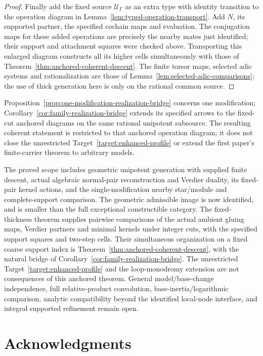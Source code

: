 \documentclass[11pt]{article}
\theoremstyle{definition}
\theoremstyle{remark}
\begin{document}
\begin{proof}
Finally add the fixed source $\mathcal U_\Gamma$ as an extra type
with identity transition to the operation diagram in
Lemma~\ref{lem:typed-operation-transport}.  Add $N$, its supported
partner, the specified cochain maps and evaluation.  The conjugation
maps for these added operations are precisely the nearby mates just
identified; their support and attachment squares were checked above.
Transporting this enlarged diagram constructs all its higher cells
simultaneously with those of Theorem~\ref{thm:anchored-coherent-descent}.
The finite torsor maps, selected adic systems and rationalization are
those of Lemma~\ref{lem:selected-adic-comparisons}; the use of thick
generation here is only on the rational common source.
\end{proof}

Proposition~\ref{prop:one-modification-realization-bridge} concerns one
modification; Corollary~\ref{cor:family-realization-bridge} extends its
specified arrows to the fixed-cut anchored diagrams on the same
rational unipotent subsource.  The resulting coherent statement is restricted to that anchored
operation diagram; it does not close the unrestricted
Target~\ref{target:enhanced-profile} or extend the first paper's
finite-carrier theorem to arbitrary models.

The proved scope includes geometric unipotent generation with supplied
finite descent, actual algebraic normal-pair reconstruction and
Verdier duality, its fixed-pair kernel actions, and the single-modification
nearby star/module and complete-support comparison.  The geometric
admissible image is now identified, and is smaller than the full
exceptional constructible category.  The fixed-thickness theorem supplies pairwise comparisons of the
actual ambient gluing maps, Verdier partners and minimal kernels under
integer cuts, with the specified support squares and two-step cells.
Their simultaneous organization on a fixed coarse support index is
Theorem~\ref{thm:anchored-coherent-descent}, with the natural bridge of
Corollary~\ref{cor:family-realization-bridge}.  The unrestricted
Target~\ref{target:enhanced-profile} and the loop-monodromy extension
are not consequences of this anchored theorem.  General model/base-change independence,
full relative-product convolution, base-inertia/logarithmic comparison,
analytic compatibility beyond the identified local-node interface,
and integral supported refinement remain open.

\section*{Acknowledgments}
\end{document}
